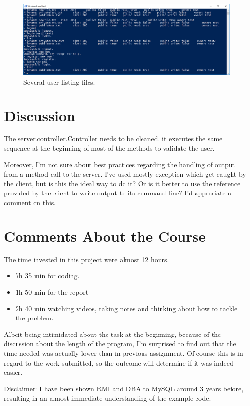 \documentclass[a4paper]{scrartcl}
\begin{document}
\begin{figure}[h!]
  \begin{center}
    \includegraphics[scale=0.5]{ui.png}
    \caption{Several user listing files.}
    \label{fig:ui}
  \end{center}
\end{figure}

\section{Discussion}
The server.controller.Controller needs to be cleaned. it executes the same sequence at the beginning of most of the methods to validate the user.

Moreover, I'm not sure about best practices regarding the handling of output  from a method call to the server. I've used mostly exception which get caught by the client, but is this the ideal way to do it? 
Or is it better to use the reference provided by the client to write output to its command line? 
I'd appreciate a comment on this.

\section{Comments About the Course}

The time invested in this project were almost 12 hours.
\begin{itemize}
        \item 7h 35 min for coding.
        \item 1h 50 min for the report.
        \item 2h 40 min watching videos, taking notes and thinking about how to tackle the problem.
\end{itemize}

Albeit being intimidated about the task at the beginning, because of the discussion about the length of the program, I'm surprised to find out that the time needed was actually lower than in previous assignment.
Of course this is in regard to the work submitted, so the outcome will determine if it was indeed easier.


Disclaimer: I have been shown RMI and DBA to MySQL around 3 years before, resulting in an almost immediate understanding of the example code.
\end{document}

